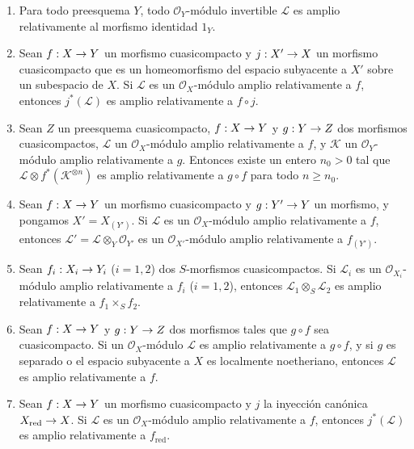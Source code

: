 \documentclass[oneside,10pt]{amsart}
\makeatletter
\renewcommand{\geq}{\geqslant}
\newcommand{\ega@arrow}[2]{\mathchoice{#1}{#2}{#2}{#2}}
\renewcommand{\to}{\ega@arrow{\longrightarrow}{\rightarrow}}
\newcommand{\oldpage}[2][]{\marginnote{\normalfont\footnotesize\textbf{#1}~|~#2}\ignorespaces}
\let\EGAOriginalLabel\label
\renewcommand{\label}[1]{\phantomsection\EGAOriginalLabel{#1}}
\makeatother
\begin{document}
\begin{proposition}[4.6.13]
\label{II.4.6.13-fr}
\begin{enumerate}
  \item[\rm{(i)}] Para todo preesquema $Y$, todo $\mathcal{O}_Y$-módulo invertible $\mathcal{L}$ es amplio relativamente al morfismo identidad $1_Y$.
  \item[\rm{(i \emph{bis})}] Sean $f:X\to Y$ un morfismo cuasicompacto y $j:X'\to X$ un morfismo cuasicompacto que es un homeomorfismo del espacio subyacente a $X'$ sobre un subespacio de $X$.
    Si $\mathcal{L}$ es un $\mathcal{O}_X$-módulo amplio relativamente a $f$, entonces $j^*(\mathcal{L})$ es amplio relativamente a $f\circ j$.
  \item[\rm{(ii)}] Sean $Z$ un preesquema cuasicompacto, $f:X\to Y$ y $g:Y\to Z$ dos morfismos cuasicompactos, $\mathcal{L}$ un $\mathcal{O}_X$-módulo amplio relativamente a $f$, y $\mathcal{K}$ un $\mathcal{O}_Y$-módulo amplio relativamente a $g$.
    Entonces existe un entero $n_0>0$ tal que $\mathcal{L}\otimes f^*(\mathcal{K}^{\otimes n})$ es amplio relativamente a $g\circ f$ para todo $n\geq n_0$.
  \item[\rm{(iii)}] Sean $f:X\to Y$ un morfismo cuasicompacto y $g:Y'\to Y$ un morfismo, y pongamos $X'=X_{(Y')}$.
    Si $\mathcal{L}$ es un $\mathcal{O}_X$-módulo amplio relativamente a $f$, entonces $\mathcal{L}'=\mathcal{L}\otimes_Y\mathcal{O}_{Y'}$ es un $\mathcal{O}_{X'}$-módulo amplio relativamente a $f_{(Y')}$.
  \item[\rm{(iv)}] Sean $f_i:X_i\to Y_i$ ($i=1,2$) dos $S$-morfismos cuasicompactos.
    Si $\mathcal{L}_i$ es un $\mathcal{O}_{X_i}$-módulo amplio relativamente a $f_i$ ($i=1,2$), entonces $\mathcal{L}_1\otimes_S\mathcal{L}_2$ es amplio relativamente a $f_1\times_S f_2$.
  \item[\rm{(v)}] Sean $f:X\to Y$ y $g:Y\to Z$ dos morfismos tales que $g\circ f$ sea cuasicompacto.
    Si un
\oldpage[II]{92}
    $\mathcal{O}_X$-módulo $\mathcal{L}$ es amplio relativamente a $g\circ f$, y si $g$ es separado o el espacio subyacente a $X$ es localmente noetheriano, entonces $\mathcal{L}$ es amplio relativamente a $f$.
  \item[\rm{(vi)}] Sean $f:X\to Y$ un morfismo cuasicompacto y $j$ la inyección canónica $X_{\mathrm{red}}\to X$.
    Si $\mathcal{L}$ es un $\mathcal{O}_X$-módulo amplio relativamente a $f$, entonces $j^*(\mathcal{L})$ es amplio relativamente a $f_{\mathrm{red}}$.
\end{enumerate}
\end{proposition}
\end{document}
